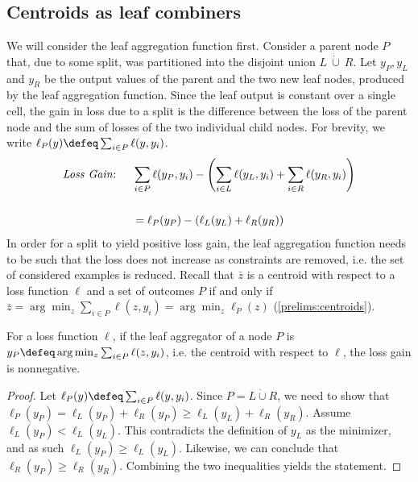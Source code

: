 \documentclass[../main.tex]{subfiles}
\begin{document}
\subsection{Centroids as leaf combiners} 


We will consider the leaf aggregation function first. Consider a parent node $P$ that, due to some split, was partitioned into the disjoint union $L~\dot{\cup}~R$.
Let $y_{P}, y_{L}$ and $y_{R}$ be the output values of the parent and the two new leaf nodes, produced by the leaf aggregation function. Since the leaf output is constant over a single cell, the gain in loss due to a split is the difference between the loss of the parent node and the sum of losses of the two individual child nodes.
For brevity, we write $\ell_{P}(y) \defeq \sum_{i \in P} \ell(y, y_{i})$.
\begin{align*}
\text{\textit{Loss Gain}: } \hspace{1em} &
\sum_{i \in P} \ell(y_{P}, y_{i}) - \left(  \sum_{i \in L} \ell(y_{L}, y_{i}) + \sum_{i \in R} \ell(y_{R}, y_{i}) \right) \\[1.5em]
&= \ell_P(y_P) - \left(\ell_L(y_L) + \ell_R(y_R) \right)
\end{align*}
In order for a split to yield positive loss gain, the leaf aggregation function needs to be such that the loss does not increase as constraints are removed, i.e. the set of considered examples is reduced. Recall that $\bar{z}$ is a centroid with respect to a loss function $\ell$ and a set of outcomes $P$ if and only if $\bar{z} = \arg\min_{z} \sum_{i \in P} \ell(z, y_{i}) = \arg\min_z \ell_P(z)$ (\ref{prelims:centroids}).
\begin{lemma}
\label{lemma:loss-gain-nonnegative}
For a loss function $\ell$, if the leaf aggregator of a node $P$ is $y_{P} \defeq \arg\min_{z} \sum_{i \in P} \ell(z, y_{i})$, i.e. the centroid with respect to $\ell$, the loss gain is nonnegative.
\end{lemma}
\begin{proof}
Let $\ell_{P}(y) \defeq \sum_{i \in P} \ell(y, y_{i})$. Since $P = L \dot{\cup}R$, we need to show that $\ell_{P}(y_{P}) = \ell_{L}(y_{P}) + \ell_{R}(y_{P}) \geq \ell_{L}(y_{L}) + \ell_{R}(y_{R})$. Assume $\ell_{L}(y_{P}) < \ell_{L}(y_{L})$. This contradicts the definition of $y_{L}$ as the minimizer, and as such $\ell_{L}(y_{P}) \geq \ell_{L}(y_{L})$. Likewise, we can conclude that $\ell_{R}(y_{P}) \geq \ell_{R}(y_{R})$. Combining the two inequalities yields the statement.
\end{proof}
\end{document}
